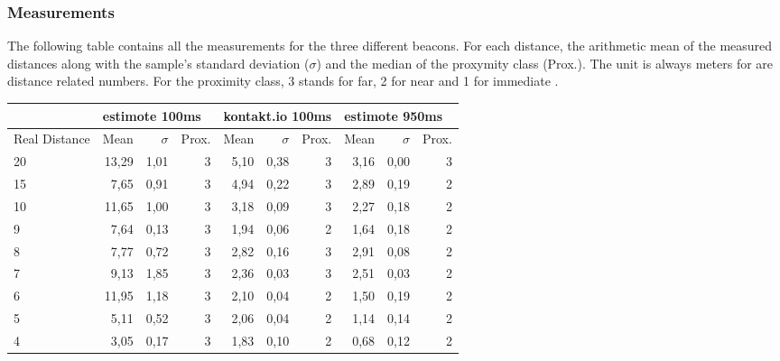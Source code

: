 \subsubsection*{Measurements}

The following table contains all the measurements for the three different beacons. For each distance, the arithmetic mean of the measured distances along with the sample's standard deviation (\(\sigma\)) and the median of the proxymity class (Prox.). The unit is always meters for are distance related numbers. For the proximity class, 3 stands for far, 2 for near and 1 for immediate \cite{clproximity}. 

\begin{table}[h]
\begin{tabular}{l|rrr|rrr|rrr}
              & \multicolumn{3}{l|}{estimote 100ms} & \multicolumn{3}{l|}{kontakt.io 100ms} & \multicolumn{3}{l}{estimote 950ms} \\ \hline
Real Distance & Mean   & \(\sigma\)         & Prox.     & Mean   & \(\sigma\)          & Prox.      & Mean  & \(\sigma\)         & Prox.     \\ \hline
20            & 13,29  & 1,01           & 3         & 5,10   & 0,38            & 3          & 3,16  & 0,00           & 3         \\
15            & 7,65   & 0,91           & 3         & 4,94   & 0,22            & 3          & 2,89  & 0,19           & 2         \\
10            & 11,65  & 1,00           & 3         & 3,18   & 0,09            & 3          & 2,27  & 0,18           & 2         \\
9             & 7,64   & 0,13           & 3         & 1,94   & 0,06            & 2          & 1,64  & 0,18           & 2         \\
8             & 7,77   & 0,72           & 3         & 2,82   & 0,16            & 3          & 2,91  & 0,08           & 2         \\
7             & 9,13   & 1,85           & 3         & 2,36   & 0,03            & 3          & 2,51  & 0,03           & 2         \\
6             & 11,95  & 1,18           & 3         & 2,10   & 0,04            & 2          & 1,50  & 0,19           & 2         \\
5             & 5,11   & 0,52           & 3         & 2,06   & 0,04            & 2          & 1,14  & 0,14           & 2         \\
4             & 3,05   & 0,17           & 3         & 1,83   & 0,10            & 2          & 0,68  & 0,12           & 2         \\

\end{tabular}
\end{table}
